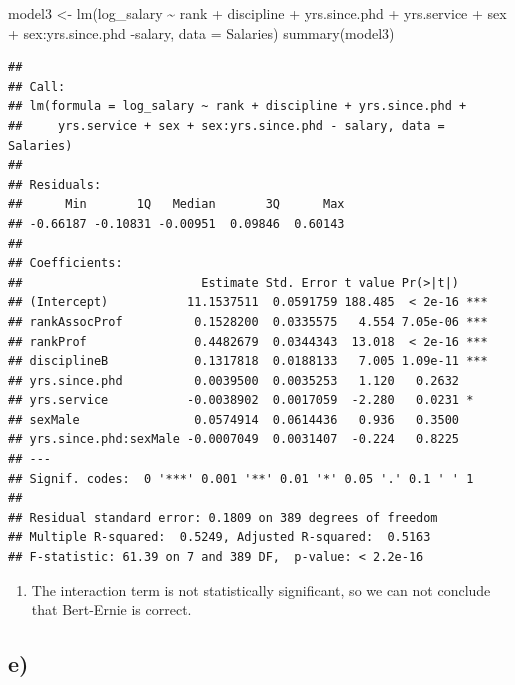 \documentclass[
]{article}
\newenvironment{Shaded}{\begin{snugshade}}{\end{snugshade}}
\newcommand{\AttributeTok}[1]{\textcolor[rgb]{0.77,0.63,0.00}{#1}}
\newcommand{\FunctionTok}[1]{\textcolor[rgb]{0.00,0.00,0.00}{#1}}
\newcommand{\NormalTok}[1]{#1}
\newcommand{\OtherTok}[1]{\textcolor[rgb]{0.56,0.35,0.01}{#1}}
\newcommand{\SpecialCharTok}[1]{\textcolor[rgb]{0.00,0.00,0.00}{#1}}
\providecommand{\tightlist}{%
  \setlength{\itemsep}{0pt}\setlength{\parskip}{0pt}}
\begin{document}
\begin{Shaded}
\begin{Highlighting}[]
\NormalTok{model3 }\OtherTok{\textless{}{-}} \FunctionTok{lm}\NormalTok{(log\_salary }\SpecialCharTok{\textasciitilde{}}\NormalTok{ rank }\SpecialCharTok{+}\NormalTok{ discipline }\SpecialCharTok{+}\NormalTok{ yrs.since.phd }\SpecialCharTok{+}\NormalTok{ yrs.service }\SpecialCharTok{+}\NormalTok{ sex }\SpecialCharTok{+}\NormalTok{ sex}\SpecialCharTok{:}\NormalTok{yrs.since.phd }\SpecialCharTok{{-}}\NormalTok{salary, }\AttributeTok{data =}\NormalTok{ Salaries)}
\FunctionTok{summary}\NormalTok{(model3)}
\end{Highlighting}
\end{Shaded}

\begin{verbatim}
## 
## Call:
## lm(formula = log_salary ~ rank + discipline + yrs.since.phd + 
##     yrs.service + sex + sex:yrs.since.phd - salary, data = Salaries)
## 
## Residuals:
##      Min       1Q   Median       3Q      Max 
## -0.66187 -0.10831 -0.00951  0.09846  0.60143 
## 
## Coefficients:
##                         Estimate Std. Error t value Pr(>|t|)    
## (Intercept)           11.1537511  0.0591759 188.485  < 2e-16 ***
## rankAssocProf          0.1528200  0.0335575   4.554 7.05e-06 ***
## rankProf               0.4482679  0.0344343  13.018  < 2e-16 ***
## disciplineB            0.1317818  0.0188133   7.005 1.09e-11 ***
## yrs.since.phd          0.0039500  0.0035253   1.120   0.2632    
## yrs.service           -0.0038902  0.0017059  -2.280   0.0231 *  
## sexMale                0.0574914  0.0614436   0.936   0.3500    
## yrs.since.phd:sexMale -0.0007049  0.0031407  -0.224   0.8225    
## ---
## Signif. codes:  0 '***' 0.001 '**' 0.01 '*' 0.05 '.' 0.1 ' ' 1
## 
## Residual standard error: 0.1809 on 389 degrees of freedom
## Multiple R-squared:  0.5249, Adjusted R-squared:  0.5163 
## F-statistic: 61.39 on 7 and 389 DF,  p-value: < 2.2e-16
\end{verbatim}

\begin{enumerate}
\def\labelenumi{\roman{enumi})}
\setcounter{enumi}{1}
\tightlist
\item
  The interaction term is not statistically significant, so we can not
  conclude that Bert-Ernie is correct.
\end{enumerate}

\hypertarget{e-1}{%
\subsection{e)}\label{e-1}}
\end{document}
